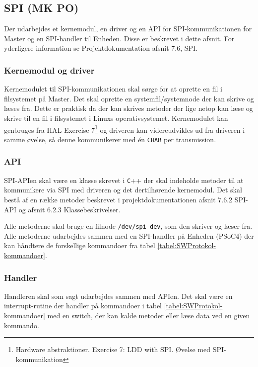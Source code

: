 \subsection{SPI (MK PO)}

Der udarbejdes et kernemodul, en driver og en API for SPI-kommunikationen for Master og en SPI-handler til Enheden. Disse er beskrevet i dette afsnit. For yderligere information se Projektdokumentation afsnit 7.6, SPI.

\subsubsection*{Kernemodul og driver}

Kernemodulet til SPI-kommunikationen skal sørge for at oprette en fil i filsystemet på Master. Det skal oprette en systemfil/systemnode der kan skrive og læses fra. Dette er praktisk da der kan skrives metoder der lige netop kan læse og skrive til en fil i filsystemet i Linuxs operativsystemet. Kernemodulet kan genbruges fra HAL Exercise 7\footnote{Hardware abstraktioner. Exercise 7: LDD with SPI. Øvelse med SPI-kommunikation} og driveren kan videreudvikles ud fra driveren i samme øvelse, så denne kommunikerer med én \verb+CHAR+ per transmission.

\subsubsection*{API}

SPI-APIen skal være en klasse skrevet i \verb+C+++ der skal indeholde metoder til at kommunikere via SPI med driveren og det dertilhørende kernemodul. Det skal bestå af en række metoder beskrevet i projektdokumentationen afsnit 7.6.2 SPI-API og afsnit 6.2.3 Klassebeskrivelser. 

Alle metoderne skal bruge en filnode \verb+/dev/spi_dev+, som den skriver og læser fra. Alle metoderne udarbejdes sammen med en SPI-handler på Enheden (PSoC4) der kan håndtere de forskellige kommandoer fra tabel \ref{tabel:SWProtokol-kommandoer}.

\subsubsection*{Handler}

Handleren skal som sagt udarbejdes sammen med APIen. Det skal være en interrupt-rutine der handler på kommandoer i tabel \ref{tabel:SWProtokol-kommandoer} med en switch, der kan kalde metoder eller læse data ved en given kommando.